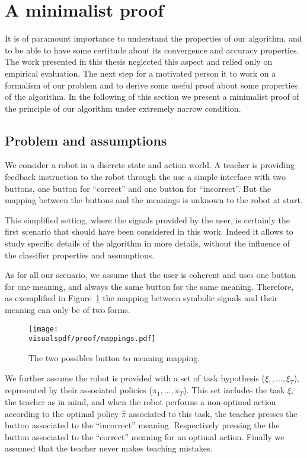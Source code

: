 
\section{A minimalist proof}
\label{chapter:limitations:proof}

It is of paramount importance to understand the properties of our algorithm, and to be able to have some certitude about its convergence and accuracy properties. The work presented in this thesis neglected this aspect and relied only on empirical evaluation. The next step for a motivated person it to work on a formalism of our problem and to derive some useful proof about some properties of the algorithm. In the following of this section we present a minimalist proof of the principle of our algorithm under extremely narrow condition.

\subsection{Problem and assumptions}

We consider a robot in a discrete state and action world. A teacher is providing feedback instruction to the robot through the use a simple interface with two buttons, one button for ``correct'' and one button for ``incorrect''. But the mapping between the buttons and the meanings is unknown to the robot at start.

This simplified setting, where the signals provided by the user, is certainly the first scenario that should have been considered in this work. Indeed it allows to study specific details of the algorithm in more details, without the influence of the classifier properties and  assumptions.

As for all our scenario, we assume that the user is coherent and uses one button for one meaning, and always the same button for the same meaning. Therefore, as exemplified in Figure~\ref{fig:proofmapping} the mapping between symbolic signals and their meaning can only be of two forms. 

\begin{figure}[!htbp]
\centering
\texttt{[image: \\visualspdf/proof/mappings.pdf]}
\caption{The two possibles button to meaning mapping.}
\label{fig:proofmapping}
\end{figure} 

We further assume the robot is provided with a set of task hypothesis ($\xi_1,\ldots,\xi_T$), represented by their associated policies ($\pi_1, \ldots, \pi_T$). This set includes the task $\hat{\xi}$, the teacher as in mind, and when the robot performs a non-optimal action according to the optimal policy $\hat{\pi}$ associated to this task, the teacher presses the button associated to the ``incorrect'' meaning. Respectively pressing the  the button associated to the ``correct'' meaning for an optimal action. Finally we assumed that the teacher never makes teaching mistakes.

